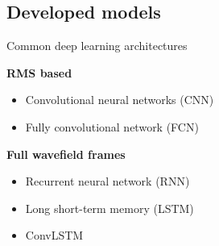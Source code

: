 \documentclass[10pt,aspectratio=169]{beamer} %
\begin{document}
\setcounter{subfigure}{0}
\subsection{Developed models}
\begin{frame}{Common deep learning architectures}
	
	\begin{minipage}[t]{0.45\textwidth}
		\textbf{RMS based}\\
		\begin{itemize}
			\item Convolutional neural networks (CNN)
			\item Fully convolutional network (FCN)
		\end{itemize}		
	\end{minipage}
	\hfill
	\begin{minipage}[t]{0.45\textwidth}
		\textbf{Full wavefield frames}\\
		\begin{itemize}
			\item Recurrent neural network (RNN)
			\item Long short-term memory (LSTM)
			\item ConvLSTM
		\end{itemize}	
	\end{minipage}
\end{frame}
\end{document}
